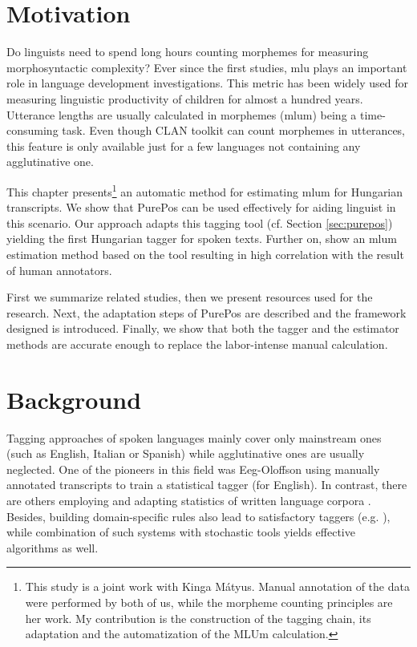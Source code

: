 
\section{Motivation}

Do linguists need to spend long hours counting morphemes for measuring morphosyntactic complexity? 
Ever since the first studies, \gls{mlu} plays an important role in language development investigations. 
This metric has been widely used for measuring linguistic productivity of children for almost a hundred years. 
Utterance lengths are usually calculated in morphemes (\acrshort{mlum}) being a time-consuming task. 
Even though CLAN toolkit \cite{MacWhinney1992} can count morphemes in utterances, this feature is only available just for a few languages not containing any agglutinative one.

This chapter presents\footnote{This study is a joint work with Kinga Mátyus. 
Manual annotation of the data were performed by both of us, while the morpheme counting principles are her work. 
My contribution is the construction of the tagging chain, its adaptation and the automatization of the MLUm calculation.} 
an automatic method for estimating \acrshort{mlum} for Hungarian transcripts. 
We show that PurePos can be used effectively for aiding linguist in this scenario. 
Our approach adapts this tagging tool (cf. Section \ref{sec:purepos}) yielding the first Hungarian tagger for spoken texts. 
Further on, show an \acrshort{mlum} estimation method based on the tool resulting in high correlation with the result of human annotators. 

First we summarize related studies, then we present resources used for the research. 
Next, the adaptation steps of PurePos are described and the framework designed is introduced. 
Finally, we show that both the tagger and the estimator methods are accurate enough to replace the labor-intense manual calculation.

\section{Background}

Tagging approaches of spoken languages mainly cover only mainstream ones (such as English, Italian or Spanish) while agglutinative ones are usually neglected. 
One of the pioneers in this field was Eeg-Oloffson \cite{Svartvik1982} using  manually annotated transcripts to train a statistical tagger (for English). 
In contrast, there are others employing and adapting statistics of written language corpora \cite{Mendes2004,Nivre1996,Panunzi2004}.
Besides, building domain-specific rules also lead to satisfactory taggers (e.g. \cite{Moreno2003}),
while combination of such systems with stochastic tools \cite{Bick2012} yields effective algorithms as well. 

